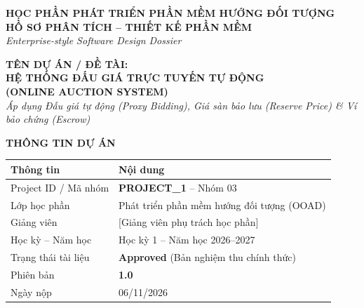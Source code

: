 \documentclass[11pt,a4paper]{article}
\begin{document}

\begin{center}
    {\large \textbf{HỌC PHẦN PHÁT TRIỂN PHẦN MỀM HƯỚNG ĐỐI TƯỢNG}}\\[0.2cm]
    {\LARGE \textbf{HỒ SƠ PHÂN TÍCH -- THIẾT KẾ PHẦN MỀM}}\\[0.15cm]
    {\normalsize \textit{Enterprise-style Software Design Dossier}}\\[0.5cm]
    
    \begin{tcolorbox}[colback=primaryblue,colframe=goldaccent,arc=3mm,width=0.98\textwidth]
        \centering \color{white}
        \vspace{0.2cm}
        {\large \textbf{TÊN DỰ ÁN / ĐỀ TÀI:}}\\[0.2cm]
        {\huge \textbf{HỆ THỐNG ĐẤU GIÁ TRỰC TUYẾN TỰ ĐỘNG}}\\[0.15cm]
        {\Large \textbf{(ONLINE AUCTION SYSTEM)}}\\[0.2cm]
        {\small \textit{Áp dụng Đấu giá tự động (Proxy Bidding), Giá sàn bảo lưu (Reserve Price) \& Ví bảo chứng (Escrow)}}
        \vspace{0.2cm}
    \end{tcolorbox}
\end{center}

\vspace{0.3cm}

\noindent \textbf{\large THÔNG TIN DỰ ÁN}
\begin{table}[H]
    \centering
    \small
    \begin{tabularx}{\textwidth}{|l|X|}
        \hline
        \textbf{Thông tin} & \textbf{Nội dung} \\ \hline
        Project ID / Mã nhóm & \textbf{PROJECT\_1} -- Nhóm 03 \\ \hline
        Lớp học phần & Phát triển phần mềm hướng đối tượng (OOAD) \\ \hline
        Giảng viên & [Giảng viên phụ trách học phần] \\ \hline
        Học kỳ -- Năm học & Học kỳ 1 -- Năm học 2026--2027 \\ \hline
        Trạng thái tài liệu & \textbf{Approved} (Bản nghiệm thu chính thức) \\ \hline
        Phiên bản & \textbf{1.0} \\ \hline
        Ngày nộp & 06/11/2026 \\ \hline
    \end{tabularx}
\end{table}
\end{document}
